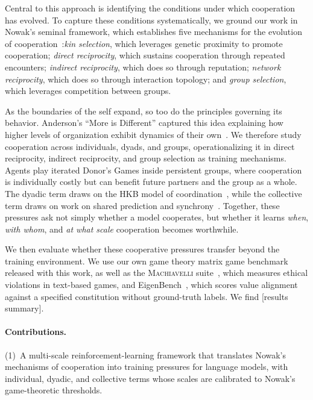 \documentclass{article}
\begin{document}
Central to this approach is identifying the conditions under which cooperation has evolved. To capture these conditions systematically, we ground our work in Nowak's seminal framework, which establishes five mechanisms for the evolution of cooperation~\citep{nowak2006}:\textit{kin selection}, which leverages genetic proximity to promote cooperation; \textit{direct reciprocity}, which sustains cooperation through repeated encounters; \textit{indirect reciprocity}, which does so through reputation; \textit{network reciprocity}, which does so through interaction topology; and \textit{group selection}, which leverages competition between groups. 

As the boundaries of the self expand, so too do the principles governing its behavior. Anderson's ``More is Different'' captured this idea explaining how higher levels of organization exhibit dynamics of their own~\citep{anderson1972}. We therefore study cooperation across individuals, dyads, and groups, operationalizing it in direct reciprocity, indirect reciprocity, and group selection as training mechanisms. Agents play iterated Donor's Games inside persistent groups, where cooperation is individually costly but can benefit future partners and the group as a whole. The dyadic term draws on the HKB model of coordination~\citep{kelso2012}, while the collective term draws on work on shared prediction and synchrony~\citep{taniguchi2026symbiotic,wiltermuth2009}. Together, these pressures ask not simply whether a model cooperates, but whether it learns \emph{when}, \emph{with whom}, and \emph{at what scale} cooperation becomes worthwhile.

We then evaluate whether these cooperative pressures transfer beyond the training environment. We use our own game theory matrix game benchmark released with this work, as well as the \textsc{Machiavelli} suite~\citep{pan2023machiavelli}, which measures ethical violations in text-based games, and EigenBench~\citep{chang2026eigenbench}, which scores value alignment against a specified constitution without ground-truth labels. We find [results summary].

\paragraph{Contributions.}
(1)~A multi-scale reinforcement-learning framework that translates Nowak's
mechanisms of cooperation into training pressures for language models, with
individual, dyadic, and collective terms whose scales are calibrated to
Nowak's game-theoretic thresholds.
\end{document}
